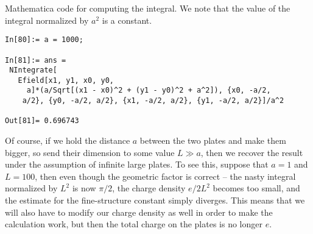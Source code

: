 \documentclass{article}
\theoremstyle{definition}
\begin{document}
\noindent Mathematica code for computing the integral. We note that the value of the integral normalized by $a^2$ is a constant. 
\begin{lstlisting}
In[80]:= a = 1000;

In[81]:= ans = 
 NIntegrate[
   Efield[x1, y1, x0, y0, 
     a]*(a/Sqrt[(x1 - x0)^2 + (y1 - y0)^2 + a^2]), {x0, -a/2, 
    a/2}, {y0, -a/2, a/2}, {x1, -a/2, a/2}, {y1, -a/2, a/2}]/a^2

Out[81]= 0.696743
\end{lstlisting}

Of course, if we hold the distance $a$ between the two plates and make them bigger, so send their dimension to some value $L \gg a$, then we recover the result under the assumption of infinite large plates. To see this, suppose that $a=1$ and $L=100$, then even though the geometric factor is correct -- the nasty integral normalized by $L^2$ is now $\pi/2$, the charge density $e/2L^2$ becomes too small, and the estimate for the fine-structure constant simply diverges. This means that we will also have to modify our charge density as well in order to make the calculation work, but then the total charge on the plates is no longer $e$. 
\end{document}
